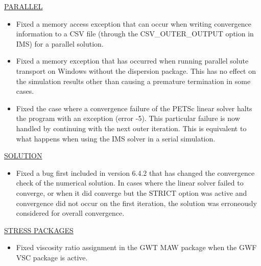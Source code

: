 \underline{PARALLEL}
\begin{itemize}
\item Fixed a memory access exception that can occur when writing convergence information to a CSV file (through the CSV\_OUTER\_OUTPUT option in IMS) for a parallel solution.
\item Fixed a memory exception that has occurred when running parallel solute transport on Windows without the dispersion package. This has no effect on the simulation results other than causing a premature termination in some cases.
\item Fixed the case where a convergence failure of the PETSc linear solver halts the program with an exception (error -5). This particular failure is now handled by continuing with the next outer iteration. This is equivalent to what happens when using the IMS solver in a serial simulation.
\end{itemize}
\underline{SOLUTION}
\begin{itemize}
\item Fixed a bug first included in version 6.4.2 that has changed the convergence check of the numerical solution. In cases where the linear solver failed to converge, or when it did converge but the STRICT option was active and convergence did not occur on the first iteration, the solution was erroneously considered for overall convergence.
\end{itemize}
\underline{STRESS PACKAGES}
\begin{itemize}
\item Fixed viscosity ratio assignment in the GWT MAW package when the GWF VSC package is active.
\end{itemize}
